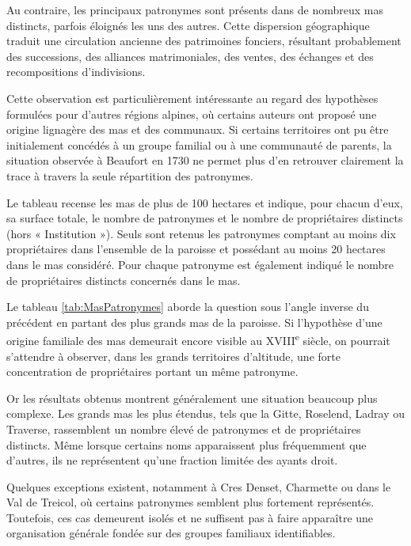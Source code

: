 \documentclass[12pt,a4paper]{report}
\begin{document}
Au contraire, les principaux patronymes sont présents dans de nombreux mas distincts, parfois éloignés les uns des autres. Cette dispersion géographique traduit une circulation ancienne des patrimoines fonciers, résultant probablement des successions, des alliances matrimoniales, des ventes, des échanges et des recompositions d'indivisions.

Cette observation est particulièrement intéressante au regard des hypothèses formulées pour d'autres régions alpines, où certains auteurs ont proposé une origine lignagère des mas et des communaux. Si certains territoires ont pu être initialement concédés à un groupe familial ou à une communauté de parents, la situation observée à Beaufort en 1730 ne permet plus d'en retrouver clairement la trace à travers la seule répartition des patronymes.

\begin{table}[H]
	\centering
	
	\caption{Grands mas et principaux patronymes associés}
	\label{tab:MasPatronymes}
\end{table}

Le tableau recense les mas de plus de 100 hectares et indique, pour chacun d'eux, sa surface totale, le nombre de patronymes et le nombre de propriétaires distincts (hors « Institution »). Seuls sont retenus les patronymes comptant au moins dix propriétaires dans l'ensemble de la paroisse et possédant au moins 20 hectares dans le mas considéré. Pour chaque patronyme est également indiqué le nombre de propriétaires distincts concernés dans le mas.

Le tableau \ref{tab:MasPatronymes} aborde la question sous l'angle inverse du précédent en partant des plus grands mas de la paroisse. Si l'hypothèse d'une origine familiale des mas demeurait encore visible au XVIII\textsuperscript{e} siècle, on pourrait s'attendre à observer, dans les grands territoires d'altitude, une forte concentration de propriétaires portant un même patronyme.

Or les résultats obtenus montrent généralement une situation beaucoup plus complexe. Les grands mas les plus étendus, tels que la Gitte, Roselend, Ladray ou Traverse, rassemblent un nombre élevé de patronymes et de propriétaires distincts. Même lorsque certains noms apparaissent plus fréquemment que d'autres, ils ne représentent qu'une fraction limitée des ayants droit.

Quelques exceptions existent, notamment à Cres Denset, Charmette ou dans le Val de Treicol, où certains patronymes semblent plus fortement représentés. Toutefois, ces cas demeurent isolés et ne suffisent pas à faire apparaître une organisation générale fondée sur des groupes familiaux identifiables.
\end{document}
